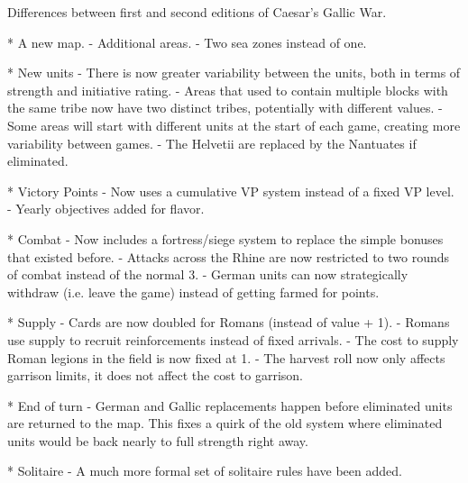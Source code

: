 Differences between first and second editions of Caesar's Gallic War.

* A new map.
  - Additional areas.
  - Two sea zones instead of one.
  
* New units
  - There is now greater variability between the units, both in terms of strength and initiative rating.
  - Areas that used to contain multiple blocks with the same tribe now have two distinct tribes, potentially with different values.
  - Some areas will start with different units at the start of each game, creating more variability between games.
  - The Helvetii are replaced by the Nantuates if eliminated. 
  
* Victory Points
  - Now uses a cumulative VP system instead of a fixed VP level.
  - Yearly objectives added for flavor.
  
* Combat
  - Now includes a fortress/siege system to replace the simple bonuses that existed before.
  - Attacks across the Rhine are now restricted to two rounds of combat instead of the normal 3.
  - German units can now strategically withdraw (i.e. leave the game) instead of getting farmed for points.
  
* Supply
  - Cards are now doubled for Romans (instead of value + 1).
  - Romans use supply to recruit reinforcements instead of fixed arrivals.
  - The cost to supply Roman legions in the field is now fixed at 1.
  - The harvest roll now only affects garrison limits, it does not affect the cost to garrison.
  
* End of turn
  - German and Gallic replacements happen before eliminated units are returned to the map. This fixes a quirk of the old system where eliminated units would be back nearly to full strength right away.
  
* Solitaire
  - A much more formal set of solitaire rules have been added.